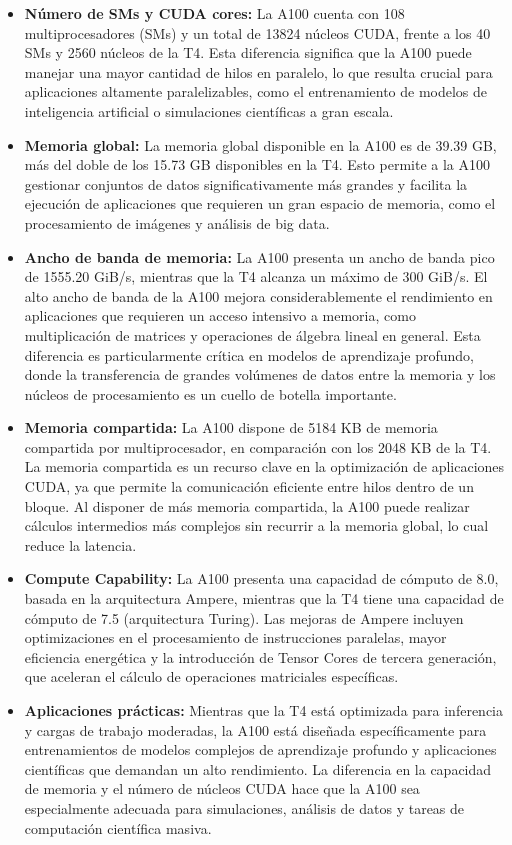 \documentclass[twocolumn,a4paper,12pt]{article}
\begin{document}
\begin{itemize}
    \item \textbf{Número de SMs y CUDA cores:} La A100 cuenta con 108 multiprocesadores (SMs) y un total de 13824 núcleos CUDA, frente a los 40 SMs y 2560 núcleos de la T4. Esta diferencia significa que la A100 puede manejar una mayor cantidad de hilos en paralelo, lo que resulta crucial para aplicaciones altamente paralelizables, como el entrenamiento de modelos de inteligencia artificial o simulaciones científicas a gran escala.

    \item \textbf{Memoria global:} La memoria global disponible en la A100 es de 39.39 GB, más del doble de los 15.73 GB disponibles en la T4. Esto permite a la A100 gestionar conjuntos de datos significativamente más grandes y facilita la ejecución de aplicaciones que requieren un gran espacio de memoria, como el procesamiento de imágenes y análisis de big data.

    \item \textbf{Ancho de banda de memoria:} La A100 presenta un ancho de banda pico de 1555.20 GiB/s, mientras que la T4 alcanza un máximo de 300 GiB/s. El alto ancho de banda de la A100 mejora considerablemente el rendimiento en aplicaciones que requieren un acceso intensivo a memoria, como multiplicación de matrices y operaciones de álgebra lineal en general. Esta diferencia es particularmente crítica en modelos de aprendizaje profundo, donde la transferencia de grandes volúmenes de datos entre la memoria y los núcleos de procesamiento es un cuello de botella importante.

    \item \textbf{Memoria compartida:} La A100 dispone de 5184 KB de memoria compartida por multiprocesador, en comparación con los 2048 KB de la T4. La memoria compartida es un recurso clave en la optimización de aplicaciones CUDA, ya que permite la comunicación eficiente entre hilos dentro de un bloque. Al disponer de más memoria compartida, la A100 puede realizar cálculos intermedios más complejos sin recurrir a la memoria global, lo cual reduce la latencia.

    \item \textbf{Compute Capability:} La A100 presenta una capacidad de cómputo de 8.0, basada en la arquitectura Ampere, mientras que la T4 tiene una capacidad de cómputo de 7.5 (arquitectura Turing). Las mejoras de Ampere incluyen optimizaciones en el procesamiento de instrucciones paralelas, mayor eficiencia energética y la introducción de Tensor Cores de tercera generación, que aceleran el cálculo de operaciones matriciales específicas.

    \item \textbf{Aplicaciones prácticas:} Mientras que la T4 está optimizada para inferencia y cargas de trabajo moderadas, la A100 está diseñada específicamente para entrenamientos de modelos complejos de aprendizaje profundo y aplicaciones científicas que demandan un alto rendimiento. La diferencia en la capacidad de memoria y el número de núcleos CUDA hace que la A100 sea especialmente adecuada para simulaciones, análisis de datos y tareas de computación científica masiva.
\end{itemize}
\end{document}
